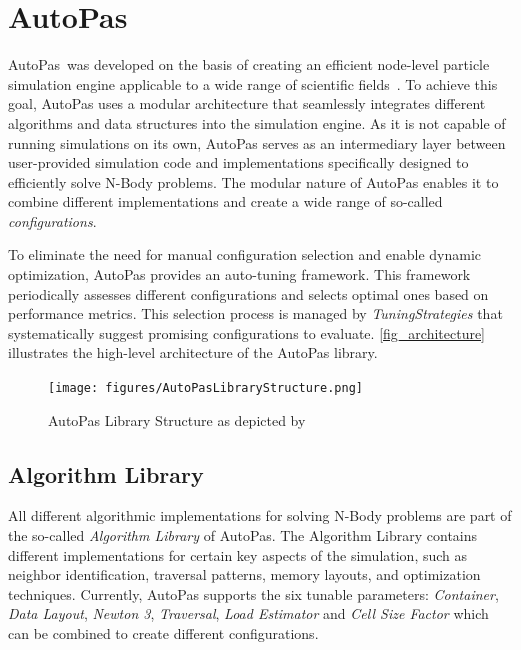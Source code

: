 \documentclass[conference]{IEEEtran}
\begin{document}
\section{AutoPas}

AutoPas\footnotemark\ was developed on the basis of creating an efficient node-level particle simulation engine applicable to a wide range of scientific fields~\cite{Tchipev2020}. To achieve this goal, AutoPas uses a modular architecture that seamlessly integrates different algorithms and data structures into the simulation engine. As it is not capable of running simulations on its own, AutoPas serves as an intermediary layer between user-provided simulation code and implementations specifically designed to efficiently solve N-Body problems. The modular nature of AutoPas enables it to combine different implementations and create a wide range of so-called \textit{configurations}.

To eliminate the need for manual configuration selection and enable dynamic optimization, AutoPas provides an auto-tuning framework. This framework periodically assesses different configurations and selects optimal ones based on performance metrics. This selection process is managed by \textit{TuningStrategies} that systematically suggest promising configurations to evaluate. \autoref{fig_architecture} illustrates the high-level architecture of the AutoPas library.

\begin{figure}[H]
    \centering
    \texttt{[image: figures/AutoPasLibraryStructure.png]}
    \caption{AutoPas Library Structure as depicted by~\cite{Newcome2023Poster}}
    \label{fig_architecture}
\end{figure}

\subsection{Algorithm Library}



All different algorithmic implementations for solving N-Body problems are part of the so-called \textit{Algorithm Library} of AutoPas. The Algorithm Library contains different implementations for certain key aspects of the simulation, such as neighbor identification, traversal patterns, memory layouts, and optimization techniques. Currently, AutoPas supports the six tunable parameters: \textit{Container}, \textit{Data Layout}, \textit{Newton 3}, \textit{Traversal}, \textit{Load Estimator} and \textit{Cell Size Factor} which can be combined to create different configurations.
\end{document}
